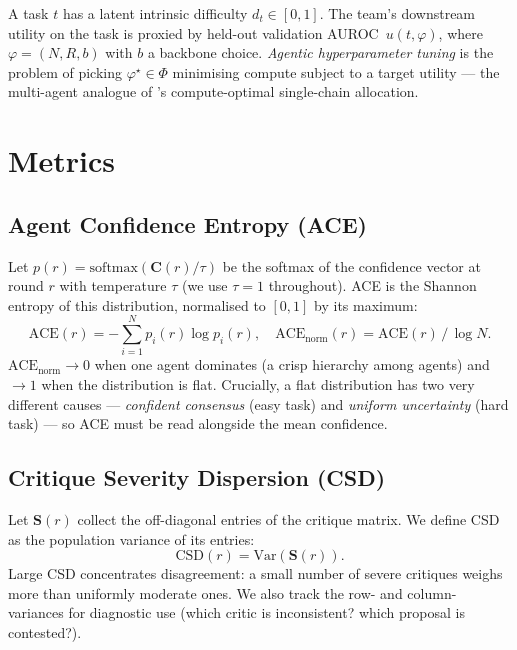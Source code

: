 \documentclass[10pt,a4paper]{article}
\begin{document}
A task $t$ has a latent intrinsic difficulty $d_t\!\in\![0,1]$. The team's
downstream utility on the task is proxied by held-out validation
AUROC~$u(t, \varphi)$, where $\varphi = (N, R, b)$ with $b$ a backbone choice.
\emph{Agentic hyperparameter tuning} is the problem of picking
$\varphi^\star\!\in\!\Phi$ minimising compute subject to a target utility ---
the multi-agent analogue of \citet{snell2024scaling}'s compute-optimal
single-chain allocation.

\section{Metrics}\label{sec:metrics}

\subsection{Agent Confidence Entropy (ACE)}

Let $p(r) = \mathrm{softmax}(\mathbf{C}(r)/\tau)$ be the softmax of the
confidence vector at round $r$ with temperature $\tau$ (we use $\tau=1$
throughout). ACE is the Shannon entropy of this distribution, normalised to
$[0,1]$ by its maximum:
\begin{equation}
  \mathrm{ACE}(r) = -\sum_{i=1}^{N} p_i(r) \log p_i(r),\quad
  \mathrm{ACE}_{\mathrm{norm}}(r) = \mathrm{ACE}(r)\,/\,\log N.
\end{equation}
$\mathrm{ACE}_{\mathrm{norm}}\!\to\!0$ when one agent dominates (a crisp hierarchy
among agents) and $\to\!1$ when the distribution is flat. Crucially, a flat
distribution has two very different causes --- \emph{confident consensus}
(easy task) and \emph{uniform uncertainty} (hard task) --- so ACE must be read
alongside the mean confidence.

\subsection{Critique Severity Dispersion (CSD)}

Let $\mathbf{S}(r)$ collect the off-diagonal entries of the critique matrix.
We define CSD as the population variance of its entries:
\begin{equation}
  \mathrm{CSD}(r) = \mathrm{Var}\left(\mathbf{S}(r)\right).
\end{equation}
Large CSD concentrates disagreement: a small number of severe critiques weighs
more than uniformly moderate ones. We also track the row- and column-variances
for diagnostic use (which critic is inconsistent? which proposal is contested?).
\end{document}
